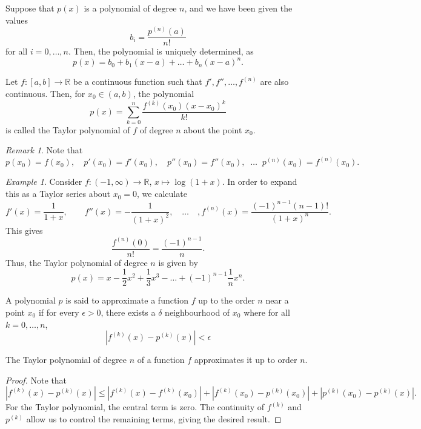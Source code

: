 \documentclass[11pt]{article}
\def\R{\mathbb{R}}
\theoremstyle{definition}
\theoremstyle{remark}
\newtheorem*{remark}{Remark}
\newtheorem*{example}{Example}
\numberwithin{equation}{module}
\begin{document}
    \begin{lemma}
        Suppose that $p(x)$ is a polynomial of degree $n$, and we have been given the
        values \[
            b_i = \frac{p^{(n)}(a)}{n!}
        \] for all $i = 0, \dots, n$. Then, the polynomial is uniquely determined,
        as \[
            p(x) = b_0 + b_1(x - a) + \dots + b_n(x - a)^n.
        \] 
    \end{lemma}

    \begin{definition}
        Let $f\colon [a, b] \to \R$ be a continuous function such that $f', f'',
        \dots, f^{(n)}$ are also continuous. Then, for $x_0 \in (a, b)$, 
        the polynomial \[
            p(x) = \sum_{k = 0}^n \frac{f^{(k)}(x_0)(x - x_0)^k}{k!}
        \] is called the Taylor polynomial of $f$ of degree $n$ about the point
        $x_0$.
        \begin{remark}
            Note that \[
                p(x_0) = f(x_0), \quad
                p'(x_0) = f'(x_0), \quad
                p''(x_0) = f''(x_0), \;\; \dots \;\;
                p^{(n)}(x_0) = f^{(n)}(x_0).
            \] 
        \end{remark}
    \end{definition}
    \begin{example}
        Consider $f\colon (-1, \infty) \to \R$, $x \mapsto \log{(1 + x)}$.
        In order to expand this as a Taylor series about $x_0 = 0$, we calculate \[
            f'(x) = \frac{1}{1 + x}, \qquad f''(x) = -\frac{1}{(1 + x)^2},
            \quad\dots\quad,
            f^{(n)}(x) = \frac{(-1)^{n - 1}(n - 1)!}{(1 + x)^{n}}.
        \] This gives \[
            \frac{f^{(n)}(0)}{n!} = \frac{(-1)^{n - 1}}{n}.
        \] Thus, the Taylor polynomial of degree $n$ is given by \[
            p(x) = x - \frac{1}{2}x^2 + \frac{1}{3}x^3 - \dots + (-1)^{n -
            1}\frac{1}{n}x^n.
        \]  
    \end{example}

    \begin{definition}
        A polynomial $p$ is said to approximate a function $f$ up to the order $n$
        near a point $x_0$ if for every $\epsilon > 0$, there exists a $\delta$
        neighbourhood of $x_0$ where for all $k = 0, \dots, n$, \[
            |f^{(k)}(x) - p^{(k)}(x)| < \epsilon
        \]
    \end{definition}

    \begin{lemma}
        The Taylor polynomial of degree $n$ of a function $f$ approximates it up to 
        order $n$.
    \end{lemma}
    \begin{proof}
        Note that \[
            |f^{(k)}(x) - p^{(k)}(x)| \leq |f^{(k)}(x) - f^{(k)}(x_0)| + 
                |f^{(k)}(x_0) - p^{(k)}(x_0)| + |p^{(k)}(x_0) - p^{(k)}(x)|.
        \] For the Taylor polynomial, the central term is zero. The continuity of
        $f^{(k)}$ and $p^{(k)}$ allow us to control the remaining terms, giving the
        desired result.
    \end{proof}
\end{document}
